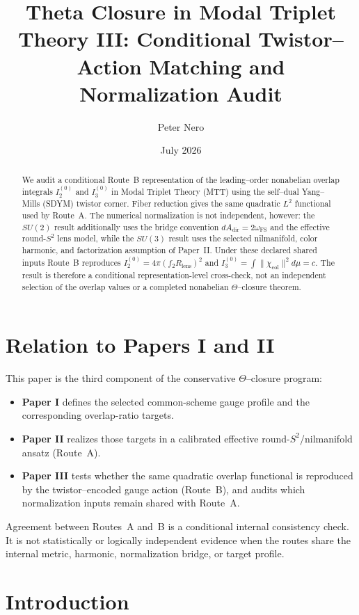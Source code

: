 \documentclass[11pt]{article}
\title{Theta Closure in Modal Triplet Theory III:
Conditional Twistor--Action Matching and Normalization Audit}
\author{Peter Nero}
\date{July 2026}
\begin{document}
\maketitle

\begin{abstract}
We audit a conditional Route~B representation of the leading--order nonabelian
overlap integrals $I_2^{(0)}$ and $I_3^{(0)}$ in Modal Triplet Theory (MTT)
using the self--dual Yang--Mills (SDYM) twistor corner. Fiber reduction gives
the same quadratic $L^2$ functional used by Route~A. The numerical
normalization is not independent, however: the $SU(2)$ result additionally
uses the bridge convention $dA_{\mathrm{dir}}=2\omega_{\mathrm{FS}}$ and the
effective round-$S^2$ lens model, while the $SU(3)$ result uses the selected
nilmanifold, color harmonic, and factorization assumption of Paper~II. Under
these declared shared inputs Route~B reproduces
$I_2^{(0)}=4\pi(f_2R_{\mathrm{lens}})^2$ and
$I_3^{(0)}=\int\|\chi_{\mathrm{col}}\|^2d\mu=c$. The result is therefore a
conditional representation-level cross-check, not an independent selection
of the overlap values or a completed nonabelian $\Theta$--closure theorem.
\end{abstract}


\section{Relation to Papers I and II}

This paper is the third component of the conservative $\Theta$--closure program:
\begin{itemize}
\item \textbf{Paper I} defines the selected common-scheme gauge profile and
the corresponding overlap-ratio targets.
\item \textbf{Paper II} realizes those targets in a calibrated effective
round-$S^2$/nilmanifold ansatz (Route~A).
\item \textbf{Paper III} tests whether the same quadratic overlap functional
is reproduced by the twistor--encoded gauge action (Route~B), and audits which
normalization inputs remain shared with Route~A.
\end{itemize}

Agreement between Routes~A and~B is a conditional internal consistency check.
It is not statistically or logically independent evidence when the routes
share the internal metric, harmonic, normalization bridge, or target profile.

\section{Introduction}
\end{document}
